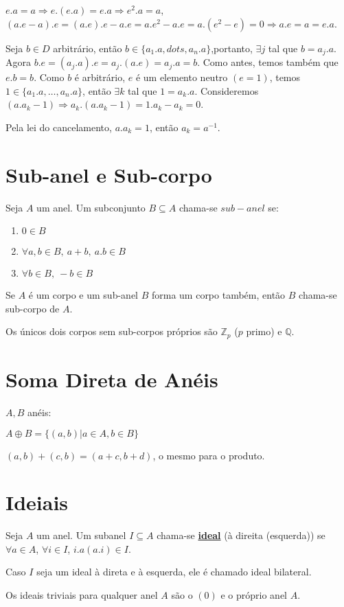 \documentclass[12pt]{book}
\newcommand{\integer}{\mathbb{Z}}
\newcommand{\mytitle}[1]{\textbf{\underline{#1}}}
\begin{document}
  $e.a=a \Rightarrow e.(e.a)=e.a \Rightarrow e^2.a=a$, $(a.e-a).e=(a.e).e-a.e=a.e^2-a.e=a.(e^2-e)=0\Rightarrow a.e=a=e.a$.

  Seja $b\in D$ arbitrário, então $b \in \{a_1.a,dots,a_n.a\}$,portanto, $\exists j$ tal que $b=a_j.a$. Agora $b.e=(a_j.a).e=a_j.(a.e)=a_j.a=b$. Como antes, temos também que $e.b=b$. Como $b$ é arbitrário, $e$ é um elemento neutro $(e=1)$, temos $1 \in \{a_1.a,\dots,a_n.a\}$, então $\exists k$ tal que $1=a_k.a$. Consideremos $(a.a_k-1)\Rightarrow a_k.(a.a_k-1)=1.a_k-a_k=0$.
  
  Pela lei do cancelamento, $a.a_k=1$, então $a_k=a^{-1}$.

  \section{Sub-anel e Sub-corpo}
  Seja $A$ um anel. Um subconjunto $B \subseteq A$ chama-se $sub-anel$ se:
  \begin{enumerate}
  \item $0 \in B$
  \item $\forall a,b \in B,\: a+b, \: a.b \in B$
  \item $\forall b \in B, \: -b \in B$
  \end{enumerate}
  Se $A$ é um corpo e um sub-anel $B$ forma um corpo também, então $B$ chama-se sub-corpo de $A$.

  Os únicos dois corpos sem sub-corpos próprios são $\integer_p$ ($p$ primo) e $\mathbb{Q}$.

  \section{Soma Direta de Anéis}

  $A,B$ anéis:

  $A \oplus B=\{(a,b)|a \in A,b \in B\}$

  $(a,b)+(c,b)=(a+c,b+d)$, o mesmo para o produto.

  \section{Ideiais}

  Seja $A$ um anel.  Um subanel $I \subseteq A$ chama-se \mytitle{ideal} (à direita (esquerda)) se $\forall a \in A$,  $\forall i \in I$, $i.a (a.i) \in I$.

  Caso $I$ seja um ideal à direta e à esquerda, ele é chamado ideal bilateral.

  Os ideais triviais para qualquer anel $A$ são o $(0)$ e o próprio anel $A$.
\end{document}
